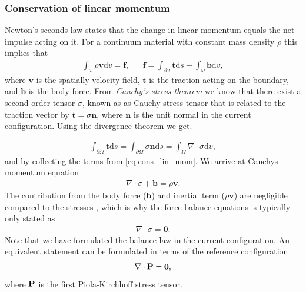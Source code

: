 \subsubsection{Conservation of linear momentum}
Newton's seconds law states that the change in linear momentum equals
the net impulse acting on it. For a continuum material with constant
mass density $\rho$ this implies that
\begin{align}
  \int_{\omega} \rho \dot{\mathbf{v}} \mathrm{d}v = \mathbf{f},
  && \mathbf{f} = \int_{\partial \omega} \mathbf{t} \mathrm{d}s
     + \int_{\omega} \mathbf{b} \mathrm{d}v,
     \label{eq:cons_lin_mom}
\end{align}
where $\mathbf{v}$ is the spatially velocity field, $\mathbf{t}$ is
the traction acting on the boundary, and $\mathbf{b}$ is the body
force. From \emph{Cauchy's stress theorem} we know that there exist a
second order tensor $\sigma$, known as as Cauchy stress tensor that is
related to the traction vector by $\mathbf{t} = \sigma \mathbf{n}$,
where $\mathbf{n}$ is the unit normal in the current configuration.
Using the divergence theorem we get.

\begin{align*}
  \int_{\partial \Omega} \mathbf{t} \mathrm{d}s
  = \int_{\partial \Omega} \sigma \mathbf{n} \mathrm{d}s
  = \int_{\Omega} \nabla \cdot \sigma \mathrm{d}v,
\end{align*}
and by collecting the terms from \eqref{eq:cons_lin_mom}. We arrive at
Cauchys momentum equation
\begin{align}
  \nabla \cdot \sigma + \mathbf{b} =  \rho \dot{\mathbf{v}}.
  \label{eq:chauch_momentum_eq}
\end{align}
The contribution from the body force ($\mathbf{b}$)  and inertial term
($\rho \dot{\mathbf{v}}$) are negligible compared to the stresses
\cite{hunter1996kd,tallarida1970left, moskowitz1981effects}, which is
why the force balance equations is typically only stated as
\begin{align}
  \nabla \cdot \sigma = \mathbf{0}.
  \label{eq:momentum_simple_current}
\end{align}
Note that we have formulated the balance law in the current
configuration. An equivalent statement can be formulated in terms of
the reference configuration
\begin{align}
  \nabla \cdot \mathbf{P} = \mathbf{0}, 
  \label{eq:momentum_simple_reference}
\end{align}
where $\mathbf{P}$ is the first Piola-Kirchhoff stress tensor.

